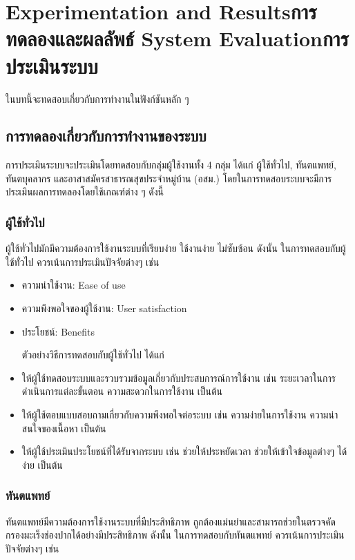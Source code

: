 \chapter{\ifproject%
      \ifenglish Experimentation and Results\else การทดลองและผลลัพธ์\fi
  \else%
      \ifenglish System Evaluation\else การประเมินระบบ\fi
  \fi}

ในบทนี้จะทดสอบเกี่ยวกับการทำงานในฟังก์ชันหลัก ๆ

\section{การทดลองเกี่ยวกับการทำงานของระบบ}
การประเมินระบบจะประเมินโดยทดสอบกับกลุ่มผู้ใช้งานทั้ง 4 กลุ่ม ได้แก่ ผู้ใช้ทั่วไป, ทันตแพทย์, ทันตบุคลากร และอาสาสมัครสาธารณสุขประจําหมู่บ้าน (อสม.) โดยในการทดสอบระบบจะมีการประเมินผลการทดลองโดยใช้เกณฑ์ต่าง ๆ ดังนี้
\subsection{ผู้ใช้ทั่วไป}
ผู้ใช้ทั่วไปมักมีความต้องการใช้งานระบบที่เรียบง่าย ใช้งานง่าย ไม่ซับซ้อน ดังนั้น ในการทดสอบกับผู้ใช้ทั่วไป ควรเน้นการประเมินปัจจัยต่างๆ เช่น

\begin{itemize}
    \item ความน่าใช้งาน: Ease of use
    \item ความพึงพอใจของผู้ใช้งาน: User satisfaction
    \item ประโยชน์: Benefits


          ตัวอย่างวิธีการทดสอบกับผู้ใช้ทั่วไป ได้แก่
    \item ให้ผู้ใช้ทดสอบระบบและรวบรวมข้อมูลเกี่ยวกับประสบการณ์การใช้งาน เช่น ระยะเวลาในการดำเนินการแต่ละขั้นตอน ความสะดวกในการใช้งาน เป็นต้น
    \item ให้ผู้ใช้ตอบแบบสอบถามเกี่ยวกับความพึงพอใจต่อระบบ เช่น ความง่ายในการใช้งาน ความน่าสนใจของเนื้อหา เป็นต้น
    \item ให้ผู้ใช้ประเมินประโยชน์ที่ได้รับจากระบบ เช่น ช่วยให้ประหยัดเวลา ช่วยให้เข้าใจข้อมูลต่างๆ ได้ง่าย เป็นต้น
\end{itemize}


\subsection{ทันตแพทย์}

ทันตแพทย์มีความต้องการใช้งานระบบที่มีประสิทธิภาพ ถูกต้องแม่นยำและสามารถช่วยในตรวจคัดกรองมะเร็งช่องปากได้อย่างมีประสิทธิภาพ ดังนั้น ในการทดสอบกับทันตแพทย์ ควรเน้นการประเมินปัจจัยต่างๆ เช่น

